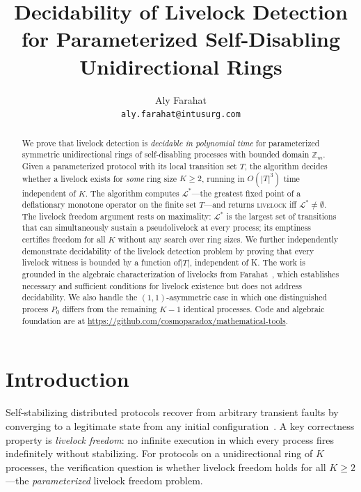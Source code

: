 \documentclass{article}
\title{\textbf{Decidability of Livelock Detection\\
       for Parameterized Self-Disabling Unidirectional Rings}}
\author{
  Aly Farahat\\
  \texttt{aly.farahat@intusurg.com}
}
\newcommand{\Ls}{\mathcal{L}^{*}}
\begin{document}
\maketitle

\begin{abstract}
We prove that livelock detection is \emph{decidable in polynomial time}
for parameterized symmetric unidirectional rings of self-disabling
processes with bounded domain $\mathbb{Z}_m$.
Given a parameterized protocol with its local transition set $T$, the algorithm decides whether a livelock exists
for \emph{some} ring size $K\!\geq\!2$, running in $O(|T|^3)$ time
independent of $K$.
The algorithm computes $\Ls$---the greatest fixed point of a
deflationary monotone operator on the finite set $T$---and returns
\textsc{livelock} iff $\Ls\!\neq\!\emptyset$.
The livelock freedom argument rests on maximality: $\Ls$ is the
largest set of transitions that can simultaneously sustain a
pseudolivelock at every process; its emptiness certifies freedom for
all $K$ without any search over ring sizes.
We further independently demonstrate decidability of the livelock detection problem by proving that every livelock witness is bounded by a function of$|T|$, independent of K.
The work is grounded in the algebraic characterization of livelocks
from Farahat~\citep{farahat2012}, which establishes necessary and
sufficient conditions for livelock existence but does not address
decidability. We also handle the $(1,1)$-asymmetric case in which one
distinguished process $P_0$ differs from the remaining $K\!-\!1$
identical processes.
Code and algebraic foundation are at
\url{https://github.com/cosmoparadox/mathematical-tools}.
\end{abstract}


\section{Introduction}

Self-stabilizing distributed protocols recover from arbitrary transient
faults by converging to a legitimate state from any initial
configuration~\citep{dijkstra1974}. A key correctness property is
\emph{livelock freedom}: no infinite execution in which every process
fires indefinitely without stabilizing. For protocols on a unidirectional
ring of $K$ processes, the verification question is whether livelock
freedom holds for all $K\!\geq\!2$---the \emph{parameterized} livelock
freedom problem.
\end{document}
